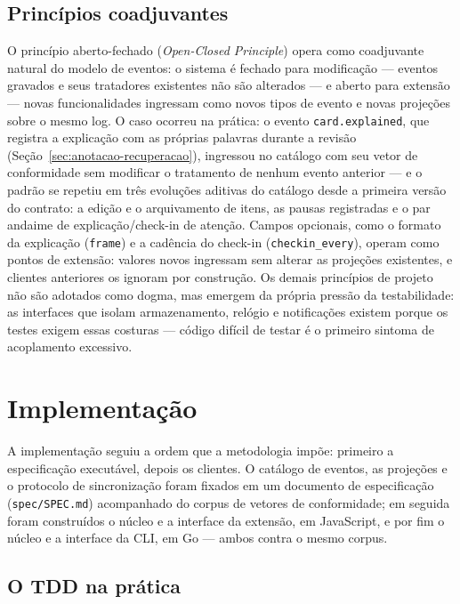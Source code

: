 \documentclass[12pt, %
openright, 
oneside,
a4paper,
english,   %
brazil]{facom-ufu-abntex2}
\begin{document}
\subsection{Princípios coadjuvantes}

O princípio aberto-fechado (\textit{Open-Closed Principle}) opera como
coadjuvante natural do modelo de eventos: o sistema é fechado para modificação
--- eventos gravados e seus tratadores existentes não são alterados --- e
aberto para extensão --- novas funcionalidades ingressam como novos tipos de
evento e novas projeções sobre o mesmo log. O caso ocorreu na prática: o
evento \texttt{card.explained}, que registra a explicação com as próprias
palavras durante a revisão (Seção~\ref{sec:anotacao-recuperacao}), ingressou
no catálogo com seu vetor de conformidade sem modificar o tratamento de
nenhum evento anterior --- e o padrão se repetiu em três evoluções aditivas
do catálogo desde a primeira versão do contrato: a edição e o arquivamento de
itens, as pausas registradas e o par andaime de explicação/check-in de
atenção. Campos opcionais, como o formato da explicação (\texttt{frame}) e a
cadência do check-in (\texttt{checkin\_every}), operam como pontos de
extensão: valores novos ingressam sem alterar as projeções existentes, e
clientes anteriores os ignoram por construção. Os demais princípios de projeto não são
adotados como dogma, mas emergem da própria pressão da testabilidade: as
interfaces que isolam armazenamento, relógio e notificações existem porque os
testes exigem essas costuras \cite{FreemanPryce2009} --- código difícil de
testar é o primeiro sintoma de acoplamento excessivo.

\section{Implementação}
\label{sec:implementacao}

A implementação seguiu a ordem que a metodologia impõe: primeiro a
especificação executável, depois os clientes. O catálogo de eventos, as
projeções e o protocolo de sincronização foram fixados em um documento de
especificação (\texttt{spec/SPEC.md}) acompanhado do corpus de vetores de
conformidade; em seguida foram construídos o núcleo e a interface da extensão,
em JavaScript, e por fim o núcleo e a interface da CLI, em Go --- ambos contra
o mesmo corpus.

\subsection{O TDD na prática}
\label{sub:tdd-pratica}
\end{document}
